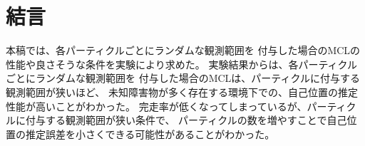 \documentclass{jarticle}
\begin{document}



\section{結言}%

本稿では、各パーティクルごとにランダムな観測範囲を
付与した場合のMCLの性能や良さそうな条件を実験により求めた。
実験結果からは、各パーティクルごとにランダムな観測範囲を
付与した場合のMCLは、パーティクルに付与する観測範囲が狭いほど、
未知障害物が多く存在する環境下での、自己位置の推定性能が高いことがわかった。
完走率が低くなってしまっているが、パーティクルに付与する観測範囲が狭い条件で、
パーティクルの数を増やすことで自己位置の推定誤差を小さくできる可能性があることがわかった。


\footnotesize
\begin{thebibliography}{99}





\end{thebibliography}

\normalsize
\end{document}
